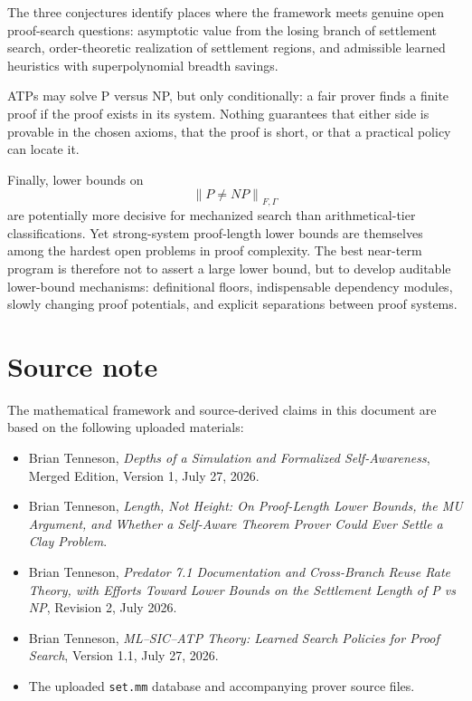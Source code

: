 \documentclass[11pt,letterpaper]{article}
\theoremstyle{named}
\newcommand{\prooflen}[2]{\left\lVert #1\right\rVert_{#2}}
\begin{document}
The three conjectures identify places where the framework meets genuine open proof-search questions: asymptotic value from the losing branch of settlement search, order-theoretic realization of settlement regions, and admissible learned heuristics with superpolynomial breadth savings.

ATPs may solve P versus NP, but only conditionally: a fair prover finds a finite proof if the proof exists in its system. Nothing guarantees that either side is provable in the chosen axioms, that the proof is short, or that a practical policy can locate it.

Finally, lower bounds on
\[
\prooflen{P\ne NP}{F,\Gamma}
\]
are potentially more decisive for mechanized search than arithmetical-tier classifications. Yet strong-system proof-length lower bounds are themselves among the hardest open problems in proof complexity. The best near-term program is therefore not to assert a large lower bound, but to develop auditable lower-bound mechanisms: definitional floors, indispensable dependency modules, slowly changing proof potentials, and explicit separations between proof systems.

\section*{Source note}

The mathematical framework and source-derived claims in this document are based on the following uploaded materials:

\begin{itemize}
\item Brian Tenneson, \emph{Depths of a Simulation and Formalized Self-Awareness}, Merged Edition, Version 1, July 27, 2026.
\item Brian Tenneson, \emph{Length, Not Height: On Proof-Length Lower Bounds, the MU Argument, and Whether a Self-Aware Theorem Prover Could Ever Settle a Clay Problem}.
\item Brian Tenneson, \emph{Predator 7.1 Documentation and Cross-Branch Reuse Rate Theory, with Efforts Toward Lower Bounds on the Settlement Length of P vs NP}, Revision 2, July 2026.
\item Brian Tenneson, \emph{ML--SIC--ATP Theory: Learned Search Policies for Proof Search}, Version 1.1, July 27, 2026.
\item The uploaded \texttt{set.mm} database and accompanying prover source files.
\end{itemize}
\end{document}
